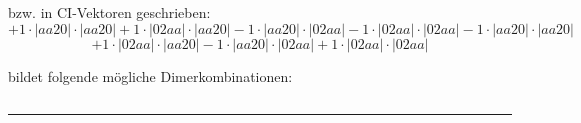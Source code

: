 \documentclass{article}
\begin{document}
\begin{minipage}{\linewidth}
bzw. in CI-Vektoren geschrieben: 
 $$+ 1 \cdot \left|aa20 \right| \cdot \left| aa20 \right| 
+ 1 \cdot \left|02aa \right| \cdot \left| aa20 \right| 
- 1 \cdot \left|aa20 \right| \cdot \left| 02aa \right| 
- 1 \cdot \left|02aa \right| \cdot \left| 02aa \right| 
- 1 \cdot \left|aa20 \right| \cdot \left| aa20 \right| 
 $$ $$ + 1 \cdot \left|02aa \right| \cdot \left| aa20 \right| 
- 1 \cdot \left|aa20 \right| \cdot \left| 02aa \right| 
+ 1 \cdot \left|02aa \right| \cdot \left| 02aa \right| 
$$



 bildet folgende mögliche Dimerkombinationen:

$$$$



\end{minipage}
\vspace{0.5cm}
\hrule
\vspace{0.5cm}
\end{document}

